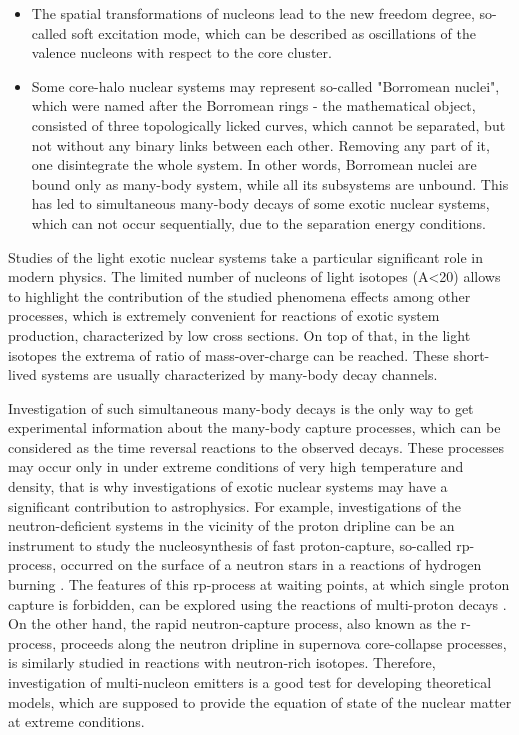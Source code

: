 \begin{itemize}
	\item 
	The spatial transformations of nucleons lead to the new freedom degree, so-called soft excitation mode, which can be described as oscillations of the valence nucleons with respect to the core cluster. 
	
	\item 
	Some core-halo nuclear systems may represent so-called "Borromean nuclei", which were named after the Borromean rings - the mathematical object, consisted of three topologically licked curves, which cannot be separated, but not without any binary links between each other.
	Removing any part of it, one disintegrate the whole system.
	In other words, Borromean nuclei are bound only as many-body system, while all its subsystems are unbound.
	This has led to simultaneous many-body decays of some exotic nuclear systems, which can not occur sequentially, due to the separation energy conditions.
	

\end{itemize}



Studies of the light exotic nuclear systems take a particular significant role in modern physics.
The limited number of nucleons of light isotopes (A<20) allows to highlight the contribution of the studied phenomena effects among other processes, which is extremely convenient for reactions of exotic system production, characterized by low cross sections.
On top of that, in the light isotopes the extrema of ratio of mass-over-charge can be reached.
These short-lived systems are usually characterized by many-body decay channels.

Investigation of such simultaneous many-body decays is the only way to get experimental information about the many-body capture processes, which can be considered as the time reversal reactions to the observed decays.
These processes may occur only in under extreme conditions of very high temperature and density, that is why investigations of exotic nuclear systems may have a significant contribution to astrophysics.
For example, investigations of the neutron-deficient systems in the vicinity of the proton dripline can be an instrument to study the nucleosynthesis of fast proton-capture, so-called rp-process, occurred on the surface of a neutron stars in a reactions of hydrogen burning \cite{GrigorenkoUFN:2019,Grigorenko:2009b,Grigorenko:2006,Grigorenko:2005a,Schatz:1998}. 
The features of this rp-process at waiting points, at which single proton capture is forbidden, can be explored using the reactions of multi-proton decays \cite{Gorres:1995}.
On the other hand, the rapid neutron-capture process, also known as the r-process, proceeds along the neutron dripline in supernova core-collapse processes, is similarly studied in reactions with neutron-rich isotopes.
Therefore, investigation of multi-nucleon emitters is a good test for developing theoretical models, which are supposed to provide the equation of state of the nuclear matter at extreme conditions. 

